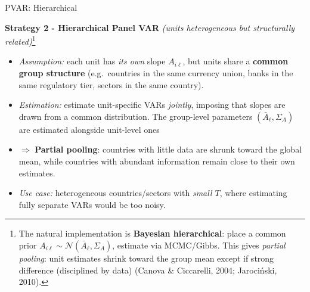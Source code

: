 \documentclass{beamer}
\begin{document}
\begin{frame}{PVAR: Hierarchical}
\small

\textbf{Strategy 2 - Hierarchical Panel VAR} \quad\textit{(units heterogeneous but structurally related)}\footnote{\scriptsize The natural implementation is \textbf{Bayesian hierarchical}: place a common prior $A_{i\ell}\sim\mathcal{N}(\bar A_\ell,\Sigma_A)$, estimate via MCMC/Gibbs. This gives \emph{partial pooling}: unit estimates shrink toward the group mean except if strong difference (disciplined by data) (Canova \& Ciccarelli, 2004; Jaroci\'nski, 2010).}


\smallskip

\begin{itemize}
\item \textit{Assumption:} each unit has \emph{its own} slope $A_{i\ell}$, but units share a \textbf{common group structure} (e.g.\ countries in the same currency union, banks in the same regulatory tier, sectors in the same country).

\item \textit{Estimation:} estimate unit-specific VARs \emph{jointly}, imposing that slopes are drawn from a common distribution. The group-level parameters $(\bar A_\ell, \Sigma_A)$ are estimated alongside unit-level ones 

\item $\Rightarrow$ \textbf{Partial pooling}: countries with little data are shrunk toward the global mean, while countries with abundant information remain close to their own estimates.

\item \textit{Use case:} heterogeneous countries/sectors with \emph{small $T$}, where estimating fully separate VARs would be too noisy.

\end{itemize}
\end{frame}
\end{document}
